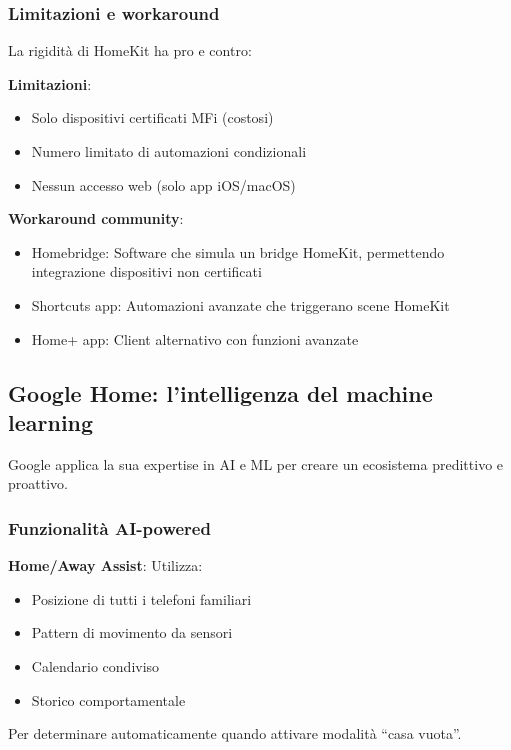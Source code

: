 \subsubsection{Limitazioni e workaround}

La rigidità di HomeKit ha pro e contro:

\textbf{Limitazioni}:
\begin{itemize}
    \item Solo dispositivi certificati MFi (costosi)
    \item Numero limitato di automazioni condizionali
    \item Nessun accesso web (solo app iOS/macOS)
\end{itemize}

\textbf{Workaround community}:
\begin{itemize}
    \item Homebridge: Software che simula un bridge HomeKit, permettendo integrazione dispositivi non certificati
    \item Shortcuts app: Automazioni avanzate che triggerano scene HomeKit
    \item Home+ app: Client alternativo con funzioni avanzate
\end{itemize}

\cite{Apple2023}

\subsection{Google Home: l'intelligenza del machine learning}

Google applica la sua expertise in AI e ML per creare un ecosistema predittivo e proattivo.

\subsubsection{Funzionalità AI-powered}

\textbf{Home/Away Assist}: Utilizza:
\begin{itemize}
    \item Posizione di tutti i telefoni familiari
    \item Pattern di movimento da sensori
    \item Calendario condiviso
    \item Storico comportamentale
\end{itemize}

Per determinare automaticamente quando attivare modalità ``casa vuota''.

